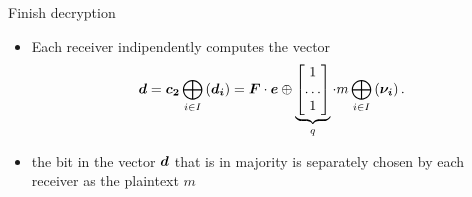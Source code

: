 \begin{frame}
\begin{overprint}
 \begin{block}{Finish decryption}
 \begin{itemize}
  \item<19-> Each receiver indipendently computes the vector 
 \begin{eqnarray*}
 \boldsymbol{d} =  \boldsymbol{c_2} \bigoplus_{i \in I} \left( \boldsymbol{d_i} \right)  
 	  =  \boldsymbol{F}\cdot \boldsymbol{e} \mathbin{\oplus} \underbrace{\begin{bmatrix} 1 \\ \dots \\ 1 \end{bmatrix}}_{q} \cdot m \bigoplus_{i \in I} \left( \boldsymbol{\nu_i} \right) .
 \end{eqnarray*}
 \item<20> the bit in the vector $\boldsymbol{d}$ that is in majority is separately chosen by each receiver as the plaintext $m$
 \end{itemize}
 \end{block}
 

 \end{overprint}

  

\end{frame}

